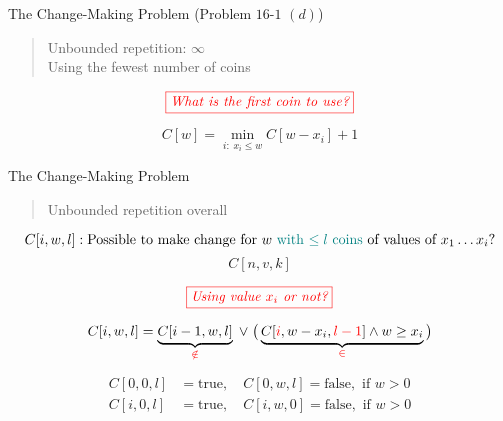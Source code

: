 \begin{frame}{}
  \begin{exampleblock}{The Change-Making Problem (Problem $16$-$1$ $(d)$)}
    \begin{quote}
      \centering
      Unbounded repetition: $\infty$ \\[8pt]
      Using the fewest number of coins
    \end{quote}
  \end{exampleblock}

  \[
    \textcolor{red}{\fbox{\it What is the first coin to use?}}
  \]

  \vspace{0.30cm}
  \[
    C[w] = \min_{i: \; x_i \le w} C[w-x_i] + 1
  \]
\end{frame}

\begin{frame}{}
  \begin{exampleblock}{The Change-Making Problem}
    \begin{quote}
      \centering
      Unbounded repetition  overall
    \end{quote}
  \end{exampleblock}

  \pause
  \[
    C[i,w,l]: \text{Possible to make change for $w$ \textcolor{teal}{with $\le l$ coins} of values of $x_{1} \dots x_{i}$?}
  \]
  \[
    C[n,v,k]
  \]

  \pause
  \[
    \textcolor{red}{\fbox{\it Using value $x_{i}$ or not?}}
  \]

  \pause
  \[
    C[i,w,l] = \underbrace{C[i-1,w,l]}_{\textcolor{red}{\notin}} \;\lor\; 
    	\big(\underbrace{C[\textcolor{red}{i}, w-x_{i}, \textcolor{red}{l-1}] \land w \ge x_{i}}_{\textcolor{red}{\in}} \big)
  \]

  \pause
  \begin{align*}
    C[0,0,l] &= \text{true}, \quad C[0,w,l] = \text{false}, \text{ if } w > 0 \\
    C[i,0,l] &= \text{true}, \quad C[i,w,0] = \text{false}, \text{ if } w > 0
  \end{align*}
\end{frame}

